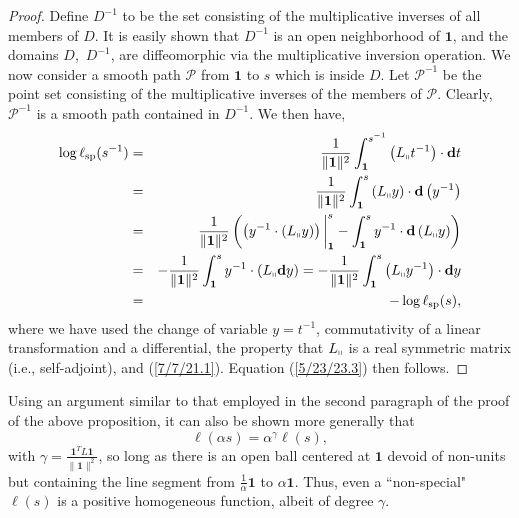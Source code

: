 \documentclass{amsart}
\theoremstyle{definition}
\numberwithin{theorem}{section}
\numberwithin{equation}{section}
\begin{document}
\begin{proof}
Define $D^{-1}$ to be the set consisting of the multiplicative inverses of all members of $D$.  It is easily shown that $D^{-1}$ is an open neighborhood of $\mathbf{1}$, and the domains \mbox{$D$, $D^{-1}$}, are diffeomorphic via the multiplicative inversion operation.  
We now consider a smooth path $\mathcal{P}$ from $\mathbf{1}$ to $s$ which is inside $D$.  Let $\mathcal{P}^{-1}$ be the point set consisting of the multiplicative inverses of the members of $\mathcal{P}$.  Clearly, $\mathcal{P}^{-1}$ is a smooth path contained in $D^{-1}$.  
 We then have, 
\begin{eqnarray}  \log \ell_{\rm sp}(s^{-1})   &=&   \frac{1}{\|{\bf 1}\|^2} \int_{\bf 1}^{s^{-1}} \left(L_{\shortparallel}t^{-1}\right) \cdot \mathbf{d}t \nonumber \\ &=&  \frac{1}{\|{\bf 1}\|^2} \int_{\bf 1}^s \left(L_{\shortparallel}y\right)\cdot \mathbf{d}\left(y^{-1}\right) \nonumber \\ &=&  \frac{1}{\|{\bf 1}\|^2}\left(\left(y^{-1}\cdot \left(L_{\shortparallel}y\right)\right)\bigg|_{\bf 1}^s - \int_{\bf 1}^s y^{-1}\cdot \mathbf{d}\left(L_{\shortparallel}y\right)\right)   \nonumber \\ &=& -\frac{1}{\|{\bf 1}\|^2} \int_{\bf 1}^s y^{-1}\cdot (L_{\shortparallel}\mathbf{d}y) = -\frac{1}{\|{\bf 1}\|^2} \int_{\bf 1}^s \left(L_{\shortparallel}y^{-1}\right) \cdot \mathbf{d}y  \nonumber \\ &=& -\log \ell_{\rm sp}(s),\label{4/2/23.5} \end{eqnarray} where we have used the change of variable $y=t^{-1}$, commutativity of a linear transformation and a differential, the property that $L_{\shortparallel}$ is a real symmetric matrix (i.e., self-adjoint), and  (\ref{7/7/21.1}).  Equation (\ref{5/23/23.3}) then follows.
\end{proof}

Using an argument similar to that employed in the second paragraph of the proof of the above proposition, it can also be shown more generally that  \[  \ell(\alpha s) = \alpha^\gamma \ell(s),\] with $\gamma = \frac{\mathbf{1}^T L \mathbf{1}}{\|\mathbf{1}\|^2}$, so long as there is an open ball centered at $\mathbf{1}$ devoid of non-units but containing the line segment from $\frac{1}{\alpha}\mathbf{1}$  to $\alpha\mathbf{1}$.  Thus, even a ``non-special" $ \ell(s)$ is a positive homogeneous function, albeit of degree $\gamma$.  
\end{document}
